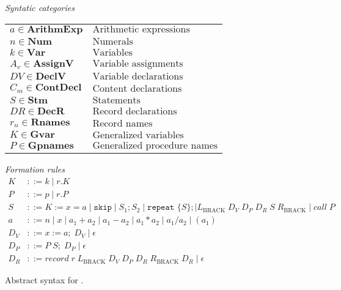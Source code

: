 \begin{figure}[h]
	\centering
	\textit{Syntatic categories}
	\vspace{4mm}


	\begin{tabular}{l l}
		$a \in \textbf{ArithmExp}$ & $\text{Arithmetic expressions}$ \\ 
		$n \in \textbf{Num}$ & $\text{Numerals}$ \\
		$k \in \textbf{Var}$ & $\text{Variables}$ \\
		$A_v \in \textbf{AssignV}$ & $\text{Variable assignments}$ \\
		$DV \in \textbf{DeclV}$ & $\text{Variable declarations}$ \\
		$C_m \in \textbf{ContDecl}$ & $\text{Content declarations}$ \\
		$S \in \textbf{Stm}$ & $\text{Statements}$\\
		$DR \in \textbf{DecR}$ & $\text{Record declarations}$\\
		$r_n \in \textbf{Rnames}$ & $\text{Record names}$ \\
		$K \in \textbf{Gvar}$ & $\text{Generalized variables}$\\
		$P \in \textbf{Gpnames}$ & $\text{Generalized procedure names}$
	\end{tabular}

	\vspace{4mm}
	\textit{Formation rules}
	\begin{align*}
		K&::=k\mid r.K \\
		P&::=p\mid r.P \\
		S&::=K:=x=a\mid \texttt{skip}\mid S_1;S_2\mid \texttt{repeat }\{S\}; \mid L_\text{BRACK} \; D_V \; D_P \; D_R \; S \; R_\text{BRACK}\mid call \; P\\
		a&::=n\mid x\mid a_1+a_2\mid a_1-a_2\mid a_1*a_2\mid a_1/a_2\mid (a_1) \\
		D_V&::= x:=a; \; D_V \mid \epsilon \\
		D_P&::= P \; S; \; D_P \mid \epsilon \\
		D_R&::= record \; r \; L_\text{BRACK} \; D_V \; D_P \; D_R \; R_\text{BRACK} \; D_R \mid \epsilon
	\end{align*}

	\caption{Abstract syntax for \dazel{}.}
	\label{fig:AbstractSyntax}
\end{figure}

